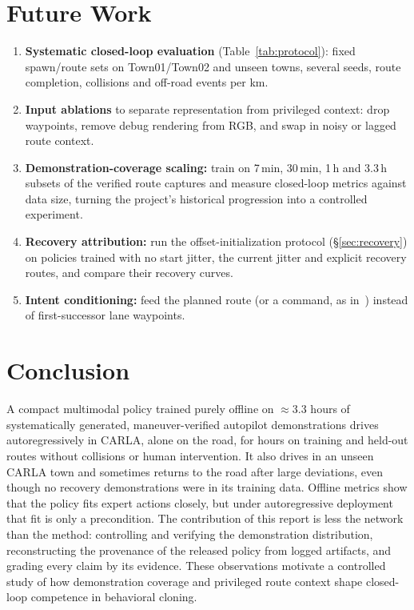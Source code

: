 \documentclass[11pt]{article}
\begin{document}
\section{Future Work}
\label{sec:future}

\begin{enumerate}
  \item \textbf{Systematic closed-loop evaluation} (Table~\ref{tab:protocol}): fixed spawn/route sets on Town01/Town02 and unseen towns, several seeds, route completion, collisions and off-road events per km.
  \item \textbf{Input ablations} to separate representation from privileged context: drop waypoints, remove debug rendering from RGB, and swap in noisy or lagged route context.
  \item \textbf{Demonstration-coverage scaling:} train on 7\,min, 30\,min, 1\,h and 3.3\,h subsets of the verified route captures and measure closed-loop metrics against data size, turning the project's historical progression into a controlled experiment.
  \item \textbf{Recovery attribution:} run the offset-initialization protocol (\S\ref{sec:recovery}) on policies trained with no start jitter, the current jitter and explicit recovery routes, and compare their recovery curves.
  \item \textbf{Intent conditioning:} feed the planned route (or a command, as in~\cite{codevilla2018cil}) instead of first-successor lane waypoints.
\end{enumerate}

\section{Conclusion}

A compact multimodal policy trained purely offline on $\approx$3.3 hours of systematically generated, maneuver-verified autopilot demonstrations drives autoregressively in CARLA, alone on the road, for hours on training and held-out routes without collisions or human intervention. It also drives in an unseen CARLA town and sometimes returns to the road after large deviations, even though no recovery demonstrations were in its training data. Offline metrics show that the policy fits expert actions closely, but under autoregressive deployment that fit is only a precondition. The contribution of this report is less the network than the method: controlling and verifying the demonstration distribution, reconstructing the provenance of the released policy from logged artifacts, and grading every claim by its evidence. These observations motivate a controlled study of how demonstration coverage and privileged route context shape closed-loop competence in behavioral cloning.
\end{document}
